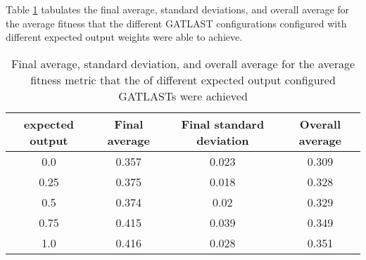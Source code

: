 Table \ref{tab:HP:GA:ExpectedOutput:average fitness} tabulates the final average, standard deviations, and overall average for the average fitness that the different GATLAST configurations configured with different expected output weights were able to achieve.
\begin{table}[tbh!]
\centering
\begin{adjustbox}{trim=0cm 0cm 0cm 0cm, clip=true}
\begin{tabular}{|c|c|c|c|}
\hline
expected output & Final average & Final standard deviation & Overall average\\
\hline
0.0 & 0.357 & 0.023 & 0.309\\\hline
0.25 & 0.375 & 0.018 & 0.328\\\hline
0.5 & 0.374 & 0.02 & 0.329\\\hline
0.75 & 0.415 & 0.039 & 0.349\\\hline
1.0 & 0.416 & 0.028 & 0.351\\\hline
\end{tabular}
\end{adjustbox}
\caption{Final average, standard deviation, and overall average for the average fitness metric that the of different expected output configured GATLASTs were achieved}
\label{tab:HP:GA:ExpectedOutput:average fitness}
\end{table}